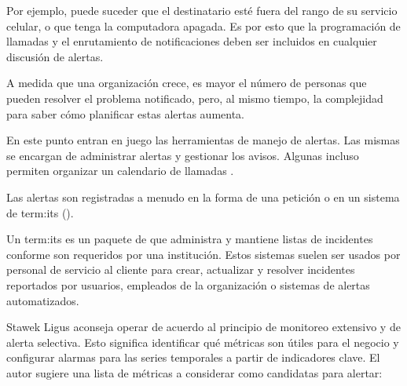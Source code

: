 Por ejemplo, puede suceder que el destinatario esté fuera del rango de su
servicio celular, o que tenga la computadora apagada. Es por esto que la
programación de llamadas y el enrutamiento de notificaciones deben ser
incluidos en cualquier discusión de alertas.

A medida que una organización crece, es mayor el número de personas que pueden
resolver el problema notificado, pero, al mismo tiempo, la complejidad para
saber cómo planificar estas alertas aumenta.

En este punto entran en juego las herramientas de manejo de alertas. Las mismas
se encargan de administrar alertas y gestionar los avisos. Algunas incluso
permiten organizar un calendario de llamadas \cite[p. ~
17]{monitoreo:monitoring_with_grapfite}.

Las alertas son registradas a menudo en la forma de una petición o 
en un sistema de \gls{term:its} ().

Un \gls{term:its} es un paquete de  que administra y mantiene
listas de incidentes conforme son requeridos por una institución. Estos
sistemas suelen ser usados por personal de servicio al cliente para crear,
actualizar y resolver incidentes reportados por usuarios, empleados de la
organización o sistemas de alertas automatizados.

Stawek Ligus aconseja operar de acuerdo al principio de monitoreo extensivo y
de alerta selectiva. Esto significa identificar qué métricas son útiles para el
negocio y configurar alarmas para las series temporales a partir de indicadores
clave. El autor sugiere una lista de métricas a considerar como candidatas para
alertar:

